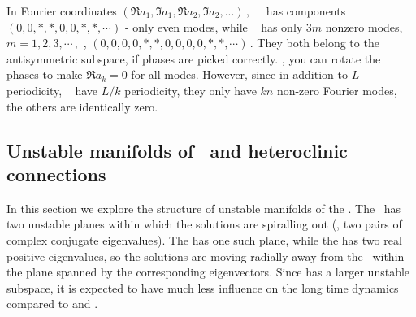 In Fourier coordinates
\(
(\Re a_1, \Im a_1, \Re a_2, \Im a_2, ...)
\,,
\)
 ~\eqv\ has components \(
(0, 0, *, *, 0, 0, *, *,\cdots)
\) - only even modes, while ~{\eqv}
has only $3m$ nonzero modes,
\(
m = 1, 2, 3, \cdots\,,
\)
\ie,
\(
(0,0,0,0,*,*,0,0,0,0,*,*,\cdots)
\,.
\)
They both belong to the antisymmetric subspace, if phases are picked
correctly.
\ie,
you can rotate the phases to make
\( \Re a_k = 0 \)
for all modes. However,
since in addition to
$L$ periodicity, ~{\eqva} have
$L/k$ periodicity, they only have
$kn$ non-zero Fourier modes, the others are identically zero.


\subsection{Unstable manifolds of \eqva\ and heteroclinic
connections}

In this section we explore the structure of unstable
manifolds of the {\eqva}.  The  \eqv\ has two unstable
planes within which the solutions are spiralling out (\ie, two
pairs of complex conjugate eigenvalues).  The  has one such plane,
while the  has two real positive eigenvalues, so the solutions are
moving radially away from the \eqv\ within the plane spanned
by the corresponding eigenvectors.  Since  has 
a larger unstable
subspace, it is expected to have much less influence on the
long time dynamics compared to  and .

